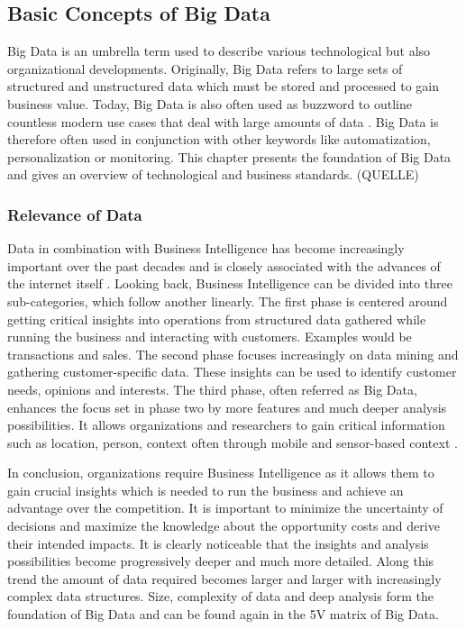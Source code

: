 \subsection{Basic Concepts of Big Data}

Big Data is an umbrella term used to describe various technological but also organizational 
developments. Originally, Big Data refers to large sets of structured and unstructured data
which must be stored and processed to gain business value. Today, Big Data is also often used 
as buzzword to outline countless modern use cases that deal with large amounts of data \cite[p.5]{Meier_2021}. Big Data 
is therefore often used in conjunction with other keywords like automatization, personalization 
or monitoring. This chapter presents the foundation of Big Data and gives an overview of 
technological and business standards. (QUELLE) 

\subsubsection{Relevance of Data}

Data in combination with Business Intelligence has become increasingly important
over the past decades and is closely associated with the advances of the internet
itself \cite[p.1165]{Chen_2012}. Looking back, Business Intelligence can be divided into three sub-categories,
which follow another linearly. The first phase is centered around getting critical
insights into operations from structured data gathered while running the business
and interacting with customers. Examples would be transactions and sales.
The second phase focuses increasingly on data mining and gathering customer-specific
data. These insights can be used to identify customer needs, opinions and interests.
The third phase, often referred as Big Data, enhances the focus set in phase
two by more features and much deeper analysis possibilities.
It allows organizations and researchers to gain critical information such as location, person,
context often through mobile and sensor-based context \cite[p.1166]{Chen_2012}. 

In conclusion, organizations require Business Intelligence as it allows them to gain
crucial insights which is needed to run the business and achieve an advantage
over the competition. It is important to minimize the uncertainty of decisions
and maximize the knowledge about the opportunity costs and derive their intended impacts. 
It is clearly noticeable that the insights and analysis possibilities become
progressively deeper and much more detailed.
Along this trend the amount of data required becomes larger and larger with
increasingly complex data structures. Size, complexity of data and deep analysis
form the foundation of Big Data and can be found again in the 5V matrix of Big Data. 

